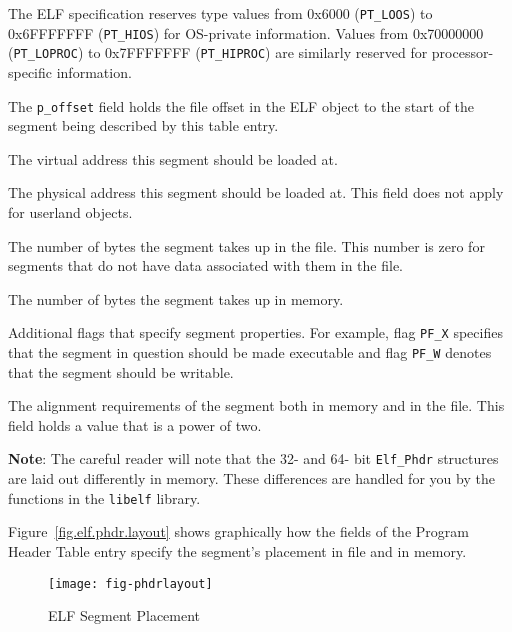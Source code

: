 \documentclass[a4paper]{book}
\makeatletter
\newcommand{\constant}[1]{\texttt{#1}}
\newcommand{\library}[1]{\texttt{#1}}
\newcommand{\parameter}[1]{\texttt{#1}}
\newcommand{\type}[1]{\texttt{#1}}
\newenvironment{callout}[2][blue]{%
  \begingroup\newcommand{\@cocolor}{#1}%
  \newcommand{\@cogroup}[1]{#2}}{\endgroup}
\newcommand{\@co}[1]{\framebox{\textbf{\color{\@cocolor}#1}}}
\newcommand{\coref}[1]{%
  \hypertarget{\@cogroup.#1.cr}{%
    \hyperlink{\@cogroup.#1.co}{\@co{#1}}}}
\makeatother
\begin{document}
\begin{callout}{phdr}
\begin{description}
    The ELF specification reserves type values from 0x6000
    (\constant{PT\_LOOS}) to 0x6FFF\-FFFF (\constant{PT\_HIOS}) for
    OS-private information.  Values from 0x70000000
    (\constant{PT\_LOPROC}) to 0x7FFFFFFF (\constant{PT\_HIPROC}) are
    similarly reserved for processor-specific information.

  \item[\coref{2}] The \parameter{p\_offset} field holds the file
    offset in the ELF object to the start of the segment being
    described by this table entry.

  \item[\coref{3}] The virtual address this segment should be loaded
    at.

  \item[\coref{4}] The physical address this segment should be loaded
    at.  This field does not apply for userland objects.

  \item[\coref{5}] The number of bytes the segment takes up in the
    file.  This number is zero for segments that do not have data
    associated with them in the file.

  \item[\coref{6}] The number of bytes the segment takes up in memory.

  \item[\coref{7}] Additional flags that specify segment properties.
    For example, flag \constant{PF\_X} specifies that the segment in
    question should be made executable and flag \constant{PF\_W}
    denotes that the segment should be writable.

  \item[\coref{8}] The alignment requirements of the segment both in
    memory and in the file.  This field holds a value that is a power
    of two.
  \end{description}
\end{callout}

\textbf{Note}: The careful reader will note that the 32- and 64- bit
\type{Elf\_Phdr} structures are laid out differently in memory.  These
differences are handled for you by the functions in the
\library{libelf} library.

Figure~\vref{fig.elf.phdr.layout} shows graphically how the fields of
the Program Header Table entry specify the segment's placement in file
and in memory.

\begin{figure}
  \caption{ELF Segment Placement}\label{fig.elf.phdr.layout}
  \begin{center}
    \texttt{[image: fig-phdrlayout]}
  \end{center}
\end{figure}
\end{document}

